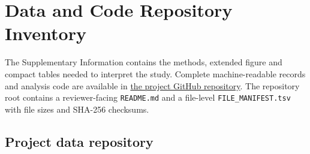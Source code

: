 ﻿%

\clearpage
\section*{Data and Code Repository Inventory}

The Supplementary Information contains the methods, extended figure and compact
tables needed to interpret the study. Complete machine-readable records and
analysis code are available in
\href{https://github.com/DudyLee/An-evidence-guided-multi-agent-workflow-for-wet-lab-optimization-of--lactoglobulin-glycation}{the project GitHub repository}.
The repository root contains a reviewer-facing \nolinkurl{README.md} and a
file-level \nolinkurl{FILE_MANIFEST.tsv} with file sizes and SHA-256 checksums.

\subsection*{Project data repository}

